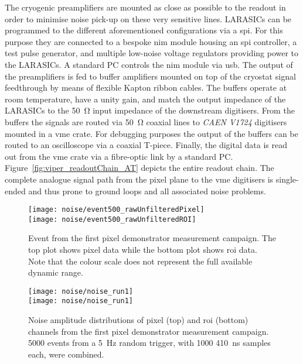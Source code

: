 The cryogenic preamplifiers are mounted as close as possible to the readout in order to minimise noise pick-up on these very sensitive lines.
LARASICs can be programmed to the different aforementioned configurations via a \gls{spi}.
For this purpose they are connected to a bespoke \gls{nim} module housing an \gls{spi} controller, a test pulse generator, and multiple low-noise voltage regulators providing power to the LARASICs.
A standard PC controls the \gls{nim} module via \gls{usb}.
The output of the preamplifiers is fed to buffer amplifiers mounted on top of the cryostat signal feedthrough by means of flexible Kapton ribbon cables.
The buffers operate at room temperature, have a unity gain, and match the output impedance of the LARASICs to the \SI{50}{\ohm} input impedance of the downstream digitisers.
From the buffers the signals are routed via \SI{50}{\ohm} coaxial lines to \emph{CAEN V1724} digitisers~\cite{caen_adc} mounted in a \gls{vme} crate.
For debugging purposes the output of the buffers can be routed to an oscilloscope via a coaxial T-piece.
Finally, the digital data is read out from the \gls{vme} crate via a fibre-optic link by a standard PC.
Figure~\ref{fig:viper_readoutChain_AT} depicts the entire readout chain.
The complete analogue signal path from the pixel plane to the \gls{vme} digitisers is single-ended and thus prone to ground loops and all associated noise problems.

\begin{figure}[tbp]
	\centering
	\texttt{[image: noise/event500\_rawUnfilteredPixel]}\\
	\texttt{[image: noise/event500\_rawUnfilteredROI]}
	\caption[Event from first pixel demonstrator measurement campaign]{%
		Event from the first pixel demonstrator measurement campaign.
		The top plot shows pixel data while the bottom plot shows \acrshort{roi} data.
		Note that the colour scale does not represent the full available dynamic range.
	}
	\label{fig:electronics_event-run1}
\end{figure}

\begin{figure}[tbp]
	\centering
	\texttt{[image: noise/noise\_run1]} \\
	\texttt{[image: noise/noise\_run1]}
	\caption[Noise distributions from first pixel demonstrator measurement campaign]{%
		Noise amplitude distributions of pixel (top) and \acrshort{roi} (bottom) channels from the first pixel demonstrator measurement campaign.
		\num{5000} events from a \SI{5}{\hertz} random trigger, with \num{1000} \SI{410}{\nano\second} samples each, were combined.
	}
	\label{fig:electronics_noise-run1}
\end{figure}


